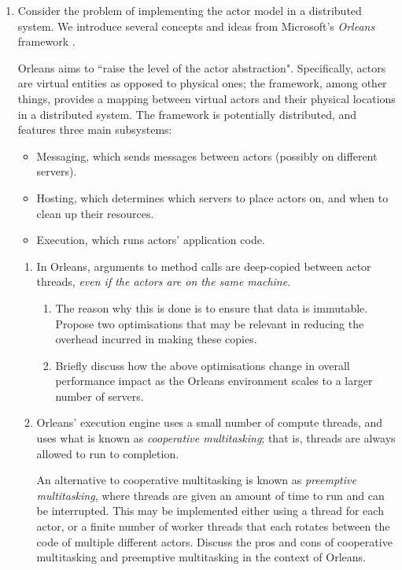 \documentclass[12pt, a4paper]{article}
\begin{document}
\begin{enumerate}
\item Consider the problem of implementing the actor model in a distributed
system. We introduce several concepts and ideas from Microsoft's \textit{Orleans} 
framework \cite{orleans}.

Orleans aims to ``raise the level of the actor abstraction". Specifically, actors
are virtual entities as opposed to physical ones; the framework, among other
things, provides a mapping between virtual actors and their physical locations
in a distributed system. The framework is potentially distributed, and features
three main subsystems:

\begin{itemize}
\item Messaging, which sends messages between actors (possibly on
different servers).
\item Hosting, which determines which servers to place actors on, and when to
clean up their resources.
\item Execution, which runs actors' application code.
\end{itemize}

\begin{enumerate}
\item In Orleans, arguments to method calls are deep-copied between actor threads,
\textit{even if the actors are on the same machine}. 
\begin{enumerate}
\item The reason why this is done is to ensure that data is immutable. Propose
two optimisations that may be relevant in reducing the overhead incurred in making
these copies.
\item Briefly discuss how the above optimisations change in overall performance
impact as the Orleans environment scales to a larger number of servers.
\end{enumerate}
\item Orleans' execution engine uses a small number of compute threads, and uses
what is known as \textit{cooperative multitasking}; that is, threads are always
allowed to run to completion. 

An alternative to cooperative multitasking is known as 
\textit{preemptive multitasking}, where threads are given an amount of time to run
and can be interrupted. This may be implemented either using a thread for each
actor, or a finite number of worker threads that each rotates between the code
of multiple different actors. Discuss the pros and cons of cooperative multitasking
and preemptive multitasking in the context of Orleans.


\end{enumerate}
\end{enumerate}
\end{document}
